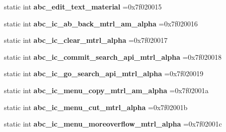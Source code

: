 \begin{DoxyCompactItemize}
static int {\bfseries abc\+\_\+edit\+\_\+text\+\_\+material} =0x7f020015
\item 
\mbox{\label{classandroid_1_1support_1_1design_1_1R_1_1drawable_aa40032e332ed5fd6b5d5729042547a39}} 
static int {\bfseries abc\+\_\+ic\+\_\+ab\+\_\+back\+\_\+mtrl\+\_\+am\+\_\+alpha} =0x7f020016
\item 
\mbox{\label{classandroid_1_1support_1_1design_1_1R_1_1drawable_a736f06461de2409229ea58b30791e402}} 
static int {\bfseries abc\+\_\+ic\+\_\+clear\+\_\+mtrl\+\_\+alpha} =0x7f020017
\item 
\mbox{\label{classandroid_1_1support_1_1design_1_1R_1_1drawable_a3e2ab50125a5e578c72f9561a760c409}} 
static int {\bfseries abc\+\_\+ic\+\_\+commit\+\_\+search\+\_\+api\+\_\+mtrl\+\_\+alpha} =0x7f020018
\item 
\mbox{\label{classandroid_1_1support_1_1design_1_1R_1_1drawable_a67200a861eee407013a4a9af03a3d10b}} 
static int {\bfseries abc\+\_\+ic\+\_\+go\+\_\+search\+\_\+api\+\_\+mtrl\+\_\+alpha} =0x7f020019
\item 
\mbox{\label{classandroid_1_1support_1_1design_1_1R_1_1drawable_a06a02249def7ea8db71d75387688b493}} 
static int {\bfseries abc\+\_\+ic\+\_\+menu\+\_\+copy\+\_\+mtrl\+\_\+am\+\_\+alpha} =0x7f02001a
\item 
\mbox{\label{classandroid_1_1support_1_1design_1_1R_1_1drawable_aefd9e0683c02e3a47cf0e3b40e451be7}} 
static int {\bfseries abc\+\_\+ic\+\_\+menu\+\_\+cut\+\_\+mtrl\+\_\+alpha} =0x7f02001b
\item 
\mbox{\label{classandroid_1_1support_1_1design_1_1R_1_1drawable_a9f8c01f3436f3bcc486864879e3d7687}} 
static int {\bfseries abc\+\_\+ic\+\_\+menu\+\_\+moreoverflow\+\_\+mtrl\+\_\+alpha} =0x7f02001c
\item 
\mbox{\label{classandroid_1_1support_1_1design_1_1R_1_1drawable_ad9a2496f978d2e6d1757344691c2197a}} 

\end{DoxyCompactItemize}
